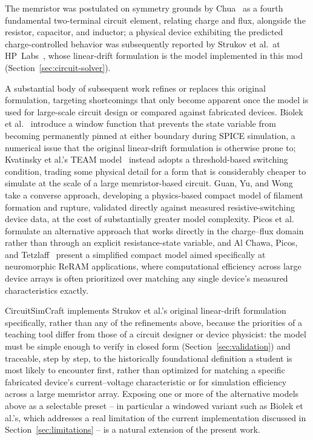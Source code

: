 The memristor was postulated on symmetry grounds by Chua~\cite{chua1971memristor} as a
fourth fundamental two-terminal circuit element, relating charge and flux, alongside the
resistor, capacitor, and inductor; a physical device exhibiting the predicted
charge-controlled behavior was subsequently reported by Strukov et al.\ at
HP~Labs~\cite{strukov2008missing}, whose linear-drift formulation is the model implemented
in this mod (Section~\ref{sec:circuit-solver}).

A substantial body of subsequent work refines or replaces this original formulation,
targeting shortcomings that only become apparent once the model is used for large-scale
circuit design or compared against fabricated devices. Biolek et
al.~\cite{biolek2009spice} introduce a window function that prevents the state variable
from becoming permanently pinned at either boundary during SPICE simulation, a numerical
issue that the original linear-drift formulation is otherwise prone to; Kvatinsky et
al.'s TEAM model~\cite{kvatinsky2013team} instead adopts a threshold-based switching
condition, trading some physical detail for a form that is considerably cheaper to simulate
at the scale of a large memristor-based circuit. Guan, Yu, and Wong~\cite{guan2012compact}
take a converse approach, developing a physics-based compact model of filament formation and
rupture, validated directly against measured resistive-switching device data, at the cost of
substantially greater model complexity. Picos et al.~\cite{picos2015chargeflux} formulate an
alternative approach that works directly in the charge--flux domain rather than through an
explicit resistance-state variable, and Al Chawa, Picos, and
Tetzlaff~\cite{alchawa2020simple} present a simplified compact model aimed specifically at
neuromorphic ReRAM applications, where computational efficiency across large device arrays
is often prioritized over matching any single device's measured characteristics exactly.

CircuitSimCraft implements Strukov et al.'s original linear-drift formulation specifically,
rather than any of the refinements above, because the priorities of a teaching tool differ
from those of a circuit designer or device physicist: the model must be simple enough to
verify in closed form (Section~\ref{sec:validation}) and traceable, step by step, to the
historically foundational definition a student is most likely to encounter first, rather
than optimized for matching a specific fabricated device's current--voltage characteristic
or for simulation efficiency across a large memristor array. Exposing one or more of the
alternative models above as a selectable preset -- in particular a windowed variant such as
Biolek et al.'s, which addresses a real limitation of the current implementation discussed
in Section~\ref{sec:limitations} -- is a natural extension of the present work.
